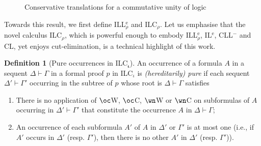 \documentclass[a4paper]{article}
\theoremstyle{definition}
\newtheorem{definition}{Definition}[section]
\theoremstyle{theorem}
\theoremstyle{remark}
\begin{document}
\begin{figure}
\begin{mathpar}
\end{mathpar}
\caption{Conservative translations for a commutative unity of logic}
\label{FigConservativeTranslationsForCommutativeUnityOfLogic}
\end{figure}

Towards this result, we first define ILL$^{\text{e}}_\rho$ and \textsf{ILC}$_\rho$.
Let us emphasise that the novel calculus \textsf{ILC$_\rho$}, which is powerful enough to embody ILL$^{\text{e}}_\rho$, IL$^{\text{e}}$, CLL$^-$ and CL, yet enjoys cut-elimination, is a technical highlight of this work.

\begin{definition}[Pure occurrences in \textsf{ILC}$_{\boldsymbol{\iota}}$]
\label{DefPureOccurrences}
An occurrence of a formula $A$ in a sequent $\Delta \vdash \Gamma$ in a formal proof $p$ in \textsf{ILC}$_\iota$ is \emph{(hereditarily) pure} if each sequent $\Delta' \vdash \Gamma'$ occurring in the subtree of $p$ whose root is $\Delta \vdash \Gamma$ satisfies

\begin{enumerate}

\item There is no application of $\oc$W, $\oc$C, $\wn$W or $\wn$C on subformulas of $A$ occurring in $\Delta' \vdash \Gamma'$ that constitute the occurrence $A$ in $\Delta \vdash \Gamma$;

\item An occurrence of each subformula $A'$ of $A$ in $\Delta'$ or $\Gamma'$ is at most one (i.e., if $A'$ occurs in $\Delta'$ (resp. $\Gamma'$), then there is no other $A'$ in $\Delta'$ (resp. $\Gamma'$)).

\end{enumerate}
\end{definition}
\end{document}
